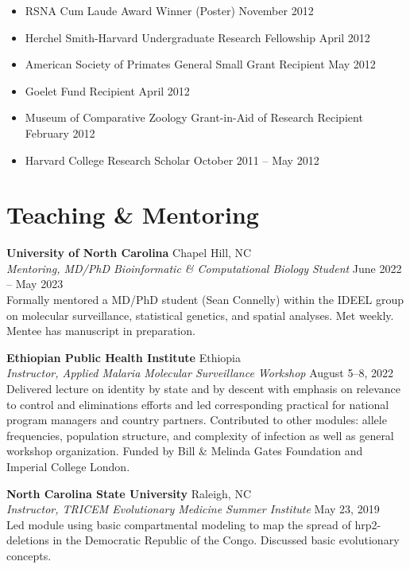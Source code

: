 \documentclass[11pt,letterpaper]{article}
\newcommand{\entry}[4]{%
  \textbf{#1} \hfill #2 \\
  \textit{#3} \hfill #4 \\[2pt]
}
\begin{document}
\begin{itemize}[leftmargin=*, itemsep=2pt, parsep=0pt]
\item RSNA Cum Laude Award Winner (Poster) \hfill November 2012
\item Herchel Smith-Harvard Undergraduate Research Fellowship \hfill April 2012
\item American Society of Primates General Small Grant Recipient \hfill May 2012
\item Goelet Fund Recipient \hfill April 2012
\item Museum of Comparative Zoology Grant-in-Aid of Research Recipient \hfill February 2012
\item Harvard College Research Scholar \hfill October 2011 -- May 2012
\end{itemize}

\vspace{18pt}

\section{Teaching \& Mentoring}

\entry{University of North Carolina}{Chapel Hill, NC}{Mentoring, MD/PhD Bioinformatic \& Computational Biology Student}{June 2022 -- May 2023}
Formally mentored a MD/PhD student (Sean Connelly) within the IDEEL group on molecular surveillance, statistical genetics, and spatial analyses. Met weekly. Mentee has manuscript in preparation.

\vspace{12pt}

\entry{Ethiopian Public Health Institute}{Ethiopia}{Instructor, Applied Malaria Molecular Surveillance Workshop}{August 5--8, 2022}
Delivered lecture on identity by state and by descent with emphasis on relevance to control and eliminations efforts and led corresponding practical for national program managers and country partners. Contributed to other modules: allele frequencies, population structure, and complexity of infection as well as general workshop organization. Funded by Bill \& Melinda Gates Foundation and Imperial College London.

\vspace{12pt}

\entry{North Carolina State University}{Raleigh, NC}{Instructor, TRICEM Evolutionary Medicine Summer Institute}{May 23, 2019}
Led module using basic compartmental modeling to map the spread of hrp2-deletions in the Democratic Republic of the Congo. Discussed basic evolutionary concepts.

\vspace{12pt}
\end{document}
